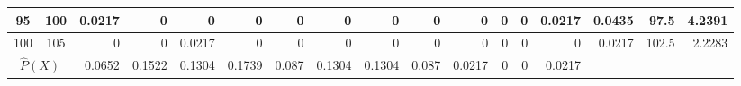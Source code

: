 \begin{table}[hb]
\begin{adjustbox}{width = \textwidth, center}
\begin{tabular}{|cc|r|r|r|r|r|r|r|r|r|r|r|r|r|r|r|}
            \rowcolor[HTML]{FFFFFF} 
            \cellcolor[HTML]{C8E4BE}95             & \cellcolor[HTML]{D9EAD3}100            & \cellcolor[HTML]{C7E9D8}0.0217                 & 0                                              & 0                                              & 0                                              & 0                                              & 0                                              & 0                                              & 0                                               & 0                                               & 0                                               & 0                                               & \cellcolor[HTML]{C7E9D8}0.0217                  & \cellcolor[HTML]{D9D2E9}0.0435                                                  & \cellcolor[HTML]{D9D2E9}97.5                                            & \cellcolor[HTML]{D9D2E9}4.2391                                                                   \\ \hline
            \rowcolor[HTML]{FFFFFF} 
            \cellcolor[HTML]{C8E4BE}100            & \cellcolor[HTML]{D9EAD3}105            & 0                                              & 0                                              & \cellcolor[HTML]{C7E9D8}0.0217                 & 0                                              & 0                                              & 0                                              & 0                                              & 0                                               & 0                                               & 0                                               & 0                                               & 0                                               & \cellcolor[HTML]{D9D2E9}0.0217                                                  & \cellcolor[HTML]{D9D2E9}102.5                                           & \cellcolor[HTML]{D9D2E9}2.2283                                                                   \\ \hline
            \multicolumn{2}{|c|}{\cellcolor[HTML]{FCE5CD}$\widehat{P}(X)$}                  & \cellcolor[HTML]{FCE5CD}0.0652                 & \cellcolor[HTML]{FCE5CD}0.1522                 & \cellcolor[HTML]{FCE5CD}0.1304                 & \cellcolor[HTML]{FCE5CD}0.1739                 & \cellcolor[HTML]{FCE5CD}0.087                  & \cellcolor[HTML]{FCE5CD}0.1304                 & \cellcolor[HTML]{FCE5CD}0.1304                 & \cellcolor[HTML]{FCE5CD}0.087                   & \cellcolor[HTML]{FCE5CD}0.0217                  & \cellcolor[HTML]{FCE5CD}0                       & \cellcolor[HTML]{FCE5CD}0                       & \cellcolor[HTML]{FCE5CD}0.0217                  & \multicolumn{1}{l|}{}                                                           & \multicolumn{1}{l|}{}                                                   & \multicolumn{1}{l|}{}                                                                            \\ \hline

\end{tabular}
\end{adjustbox}
\end{table}
